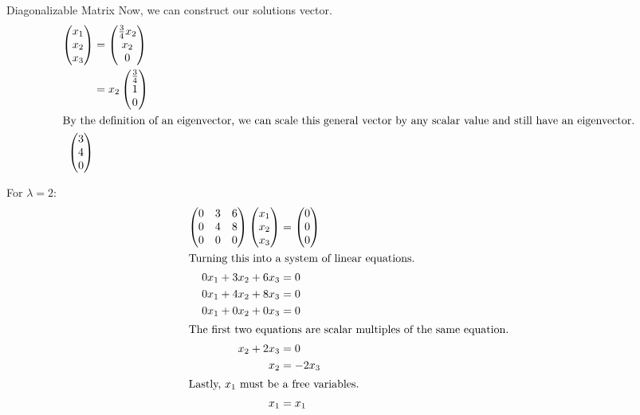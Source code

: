 \begin{example}{Diagonalizable Matrix}
  Now, we can construct our solutions vector.
  \begin{align*}
    \begin{pmatrix}
      x_{1} \\ x_{2} \\ x_{3}
    \end{pmatrix} &=
                    \begin{pmatrix}
                      \frac{3}{4}x_{2} \\ x_{2} \\ 0
                    \end{pmatrix} \\
    &= x_{2}
      \begin{pmatrix}
        \frac{3}{4} \\ 1 \\ 0
      \end{pmatrix} \\
    \intertext{By the definition of an eigenvector, we can scale this general vector by any scalar value and still have an eigenvector.}
    \begin{pmatrix}
      3 \\ 4 \\ 0
    \end{pmatrix}
  \end{align*}

  For $\lambda = 2$:
  \begin{align*}
    \begin{pmatrix}
      0 & 3 & 6 \\
      0 & 4 & 8 \\
      0 & 0 & 0
    \end{pmatrix}
              \begin{pmatrix}
                x_{1} \\ x_{2} \\ x_{3}
              \end{pmatrix} &=
                              \begin{pmatrix}
                                0 \\ 0 \\ 0
                              \end{pmatrix} \\
    \intertext{Turning this into a system of linear equations.}
    0x_{1} + 3x_{2} + 6x_{3} &= 0 \\
    0x_{1} + 4x_{2} + 8x_{3} &= 0 \\
    0x_{1} + 0x_{2} + 0x_{3} &= 0 \\
    \intertext{The first two equations are scalar multiples of the same equation.}
    x_{2} + 2x_{3} &= 0 \\
    x_{2} &= -2x_{3} \\
    \intertext{Lastly, $x_{1}$ must be a free variables.}
    x_{1} &= x_{1}
  \end{align*}


\end{example}
